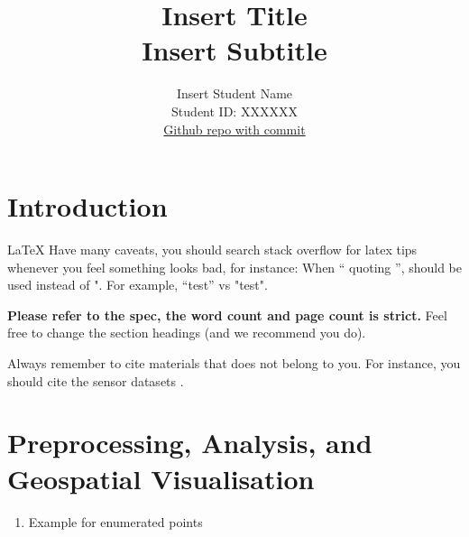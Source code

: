\documentclass[11pt]{article}
\title{\textbf{Insert Title} \\ Insert Subtitle}
\author{
Insert Student Name \\
Student ID: XXXXXX \\
\href{https://github.com/MAST30034-Applied-Data-Science/mast30034\_p1\_template/tree/fd9f1dd17fdbcb5b119b70c93a22da8210d44fd7}{Github repo with commit}
}
\begin{document}
\maketitle

\section{Introduction}

\LaTeX{} Have many caveats, you should search stack overflow for latex tips whenever you feel something looks bad, for instance:
When `` quoting '', should be used instead of ". For example, ``test'' vs "test".

\textbf{Please refer to the spec, the word count and page count is strict.} Feel free to change the section headings (and we recommend you do).

Always remember to cite materials that does not belong to you. For instance, you should cite the sensor datasets \cite{2022sensorreading, 2022sensorlocation}.

\lipsum[7]

\section{Preprocessing, Analysis, and Geospatial Visualisation}
\begin{enumerate} 
    \item Example for enumerated points
\end{enumerate}
\end{document}
